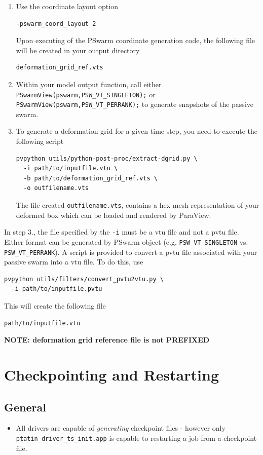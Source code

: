 \documentclass[paper=a4, fontsize=11pt,twoside]{scrartcl}
\begin{document}
{{\begin{enumerate}
\item Use the coordinate layout option
\begin{lstlisting}
-pswarm_coord_layout 2
\end{lstlisting}
Upon executing of the PSwarm coordinate generation code, the following file will be created in your output directory
\begin{lstlisting}
deformation_grid_ref.vts
\end{lstlisting}

\item Within your model output function, call either
\texttt{PSwarmView(pswarm,PSW\_VT\_SINGLETON);}
or
\texttt{PSwarmView(pswarm,PSW\_VT\_PERRANK);}
to generate snapshots of the passive swarm.

\item To generate a deformation grid for a given time step, you need to execute the following script
\begin{lstlisting}
pvpython utils/python-post-proc/extract-dgrid.py \
  -i path/to/inputfile.vtu \
  -b path/to/deformation_grid_ref.vts \
  -o outfilename.vts
\end{lstlisting}
The file created {\tt outfilename.vts}, contains a hex-mesh representation of your deformed box which can be loaded and rendered by ParaView.
\end{enumerate}

In step 3., the file specified by the \texttt{-i} must be a vtu file and not a pvtu file.
Either format can be generated by PSwarm object (e.g. \texttt{PSW\_VT\_SINGLETON} vs. \texttt{PSW\_VT\_PERRANK}).
A script is provided to convert a pvtu file associated with your passive swarm into a vtu file.
To do this, use
\begin{lstlisting}
pvpython utils/filters/convert_pvtu2vtu.py \
  -i path/to/inputfile.pvtu
\end{lstlisting}

This will create the following file
\begin{lstlisting}
path/to/inputfile.vtu
\end{lstlisting}

\textbf{NOTE: deformation grid reference file is not PREFIXED}

\section{Checkpointing and Restarting}

\subsection{General}
\begin{itemize}
\item All drivers are capable of \textit{generating} checkpoint files - however only {\tt ptatin\_driver\_ts\_init.app} is
capable to restarting a job from a checkpoint file.


\end{itemize}}}
\end{document}
